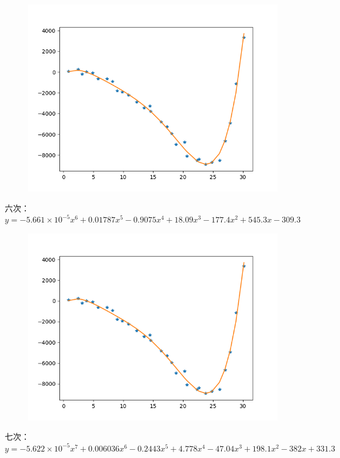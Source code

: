 \documentclass[lang=cn,a4paper]{elegantpaper}
\begin{document}
    \begin{figure}[H]
        \includegraphics[scale=0.4]{1-5.png}
    \end{figure}
    六次：$y=-5.661\times 10^{-5} x^6+0.01787x^5-0.9075x^4+18.09x^3-177.4x^2+545.3x-309.3$
    \begin{figure}[H]
        \includegraphics[scale=0.4]{1-6.png}
    \end{figure}
    七次：$y=-5.622\times10^{-5}x^7+0.006036x^6-0.2443x^5+4.778x^4-47.04x^3+198.1x^2-382x+331.3$
\end{document}
